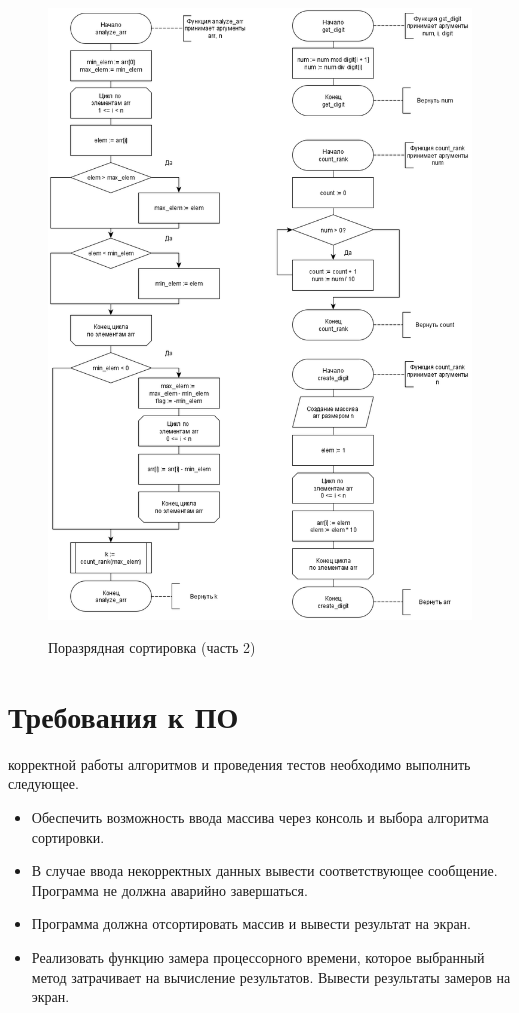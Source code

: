 \begin{figure}[pt!]
	\begin{center}
		{\includegraphics[scale = 0.53]{schemes/lsd_2}}
		\caption{Поразрядная сортировка (часть 2)}
		\label{fig4:image}
	\end{center}
\end{figure}

\newpage

\section{Требования к ПО}
 корректной работы алгоритмов и проведения тестов необходимо выполнить следующее.
\begin{itemize}
	\item Обеспечить возможность ввода массива через консоль и выбора алгоритма сортировки.
	\item В случае ввода некорректных данных вывести соответствующее сообщение. Программа не должна аварийно завершаться.
	\item Программа должна отсортировать массив и вывести результат на экран.
	\item Реализовать функцию замера процессорного времени, которое выбранный метод затрачивает на вычисление результатов. Вывести результаты замеров на экран.
\end{itemize}

